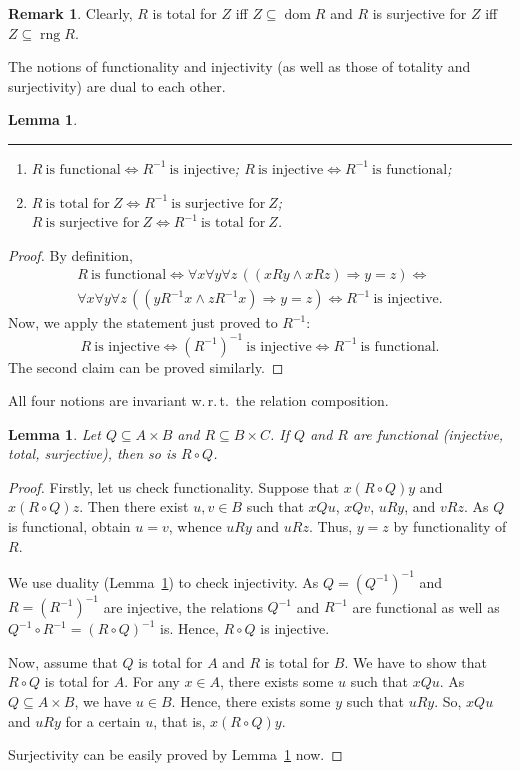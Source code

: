 \documentclass[12pt,notitlepage]{article}
\theoremstyle{plain}
\newtheorem{lemma}[thm]{Lemma}
\theoremstyle{definition}
\newtheorem{rem}[thm]{Remark}
\theoremstyle{plain}
\newcommand{\sbs}{\subseteq}
\newcommand{\dom}{\mathop{\mathrm{dom}}}
\newcommand{\rng}{\mathop{\mathrm{rng}}}
\newcommand{\1}{\mathbf{1}}
\newcommand{\0}{\mathbf{0}}
\newcommand{\ply}{\Longrightarrow}
\begin{document}
\begin{rem}
Clearly, $R$ is total for $Z$ iff $Z \sbs \dom R$ and $R$ is surjective for $Z$ iff $Z \sbs \rng R$.
\end{rem}


The notions of functionality and injectivity (as well as those of totality and surjectivity) are dual to each other.
\begin{lemma}\label{ch0:fnc_inv}\rule{1pt}{0pt}
\begin{enumerate}
\item $R\ \mbox{is functional} \iff R^{-1}\ \mbox{is injective}$; $R\ \mbox{is injective} \iff R^{-1}\ \mbox{is functional}$;
\item $R\ \mbox{is total for}\ Z \iff R^{-1}\ \mbox{is surjective for}\ Z$; $R\ \mbox{is surjective for}\ Z \iff R^{-1}\ \mbox{is total for}\ Z$.
\end{enumerate}
\end{lemma}
\begin{proof}
By definition,
\begin{multline*}
R\ \mbox{is functional} \iff \forall x \forall y \forall z\, ( (x R y \wedge x R z) \ply y = z ) \iff\\
 \forall x \forall y \forall z\, ( (y R^{-1} x \wedge z R^{-1} x) \ply y = z )  \iff R^{-1}\ \mbox{is injective}.
\end{multline*}
Now, we apply the statement just proved to $R^{-1}$:
$$
R\ \mbox{is injective} \iff (R^{-1})^{-1}\ \mbox{is injective} \iff R^{-1}\ \mbox{is functional}.
$$
The second claim can be proved similarly.
\end{proof}


\noindent All four notions are invariant w.\,r.\,t.\ the relation composition.
\begin{lemma}\label{ch0:fnc_cmp} Let $Q \sbs A \times B$ and $R \sbs B \times C$.  If $Q$ and $R$ are functional (injective, total, surjective), then so is $R \circ Q$.
\end{lemma}
\begin{proof}
Firstly, let us check functionality. Suppose that $x(R \circ Q)y$ and $x(R \circ Q)z$. Then there exist $u,v\in B$ such that $xQu$, $xQv$, $u R y$, and $v R z$. As $Q$ is functional, obtain $u = v$, whence $u R y$ and $u R z$. Thus, $y = z$ by functionality of $R$.

We use duality (Lemma~\ref{ch0:fnc_inv}) to check injectivity. As $Q = (Q^{-1})^{-1}$ and $R = (R^{-1})^{-1}$ are injective, the relations $Q^{-1}$ and $R^{-1}$ are functional as well as $Q^{-1} \circ R^{-1} = (R \circ Q)^{-1}$ is. Hence, $R \circ Q$ is injective.

Now, assume that $Q$ is total for $A$ and $R$ is total for $B$. We have to show that $R \circ Q$ is total for $A$. For any $x \in A$, there exists some $u$ such that $x Q u$. As $Q \sbs A \times B$, we have $u \in B$. Hence, there exists some $y$ such that $u R y$. So, $x Q u$ and $u R y$ for a certain $u$, that is, $x(R \circ Q)y$.

Surjectivity can be easily proved by Lemma~\ref{ch0:fnc_inv} now.
\end{proof}
\end{document}
